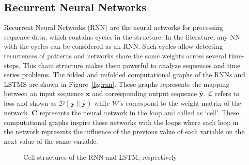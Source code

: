 \subsection{Recurrent Neural Networks}

Recurrent Neural Networks (RNN) are the neural networks for processing sequence data, which contains cycles in the structure\cite{goodfellow2016deep}. 
In the literature, any NN with the cycles can be considered as an RNN. 
Such cycles allow detecting recurrences of patterns and networks share the same weights across several time-steps\cite{graves2012supervised}. 
This chain structure makes them powerful to analyze sequences and time series problems. 
The folded and unfolded computational graphs of the RNNs and LSTMS are shown in Figure~\ref{fig:rnn}.
These graphs represents the mapping between an input sequence $\boldsymbol{x}$ and 
corresponding output sequence $\boldsymbol{\hat{y}}$.
$\boldsymbol{\mathcal{L}}$ refers to loss and shown as $\mathcal{D}\left(\boldsymbol{y}\|\boldsymbol{\hat{y}}\right)$ while $\boldsymbol{\mathcal{W}}$'s correspond to the weight matrix of the network. $\boldsymbol{C}$ represents the neural network in the loop and called as `cell'.
These computational graphs inspire these networks with the loops where each loop in the network represents the influence of the previous value of each variable on the next value of the same variable.

\begin{figure}
    \centering
  \hfill
    \caption{Cell structures of the RNN and LSTM, respectively}
    \label{fig:cells}
\end{figure}

